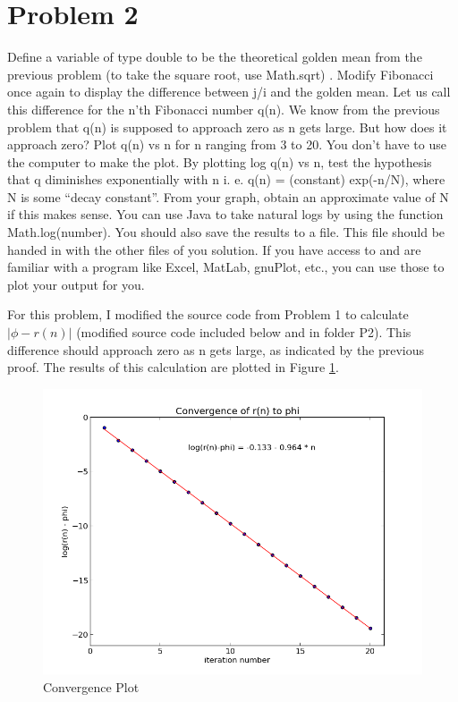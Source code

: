 \documentclass[aps,letterpaper,10pt]{article}
\begin{document}
\newpage
\section{Problem 2}
\begin{center}
\begin{minipage}[h]{.85\linewidth}
Define a variable of type double to be the theoretical golden mean from the previous problem (to take the square root, use Math.sqrt) . Modify Fibonacci once again to display the difference between j/i and the golden mean.  Let us call this difference for the n'th Fibonacci number q(n).  We know from the previous problem that q(n) is supposed to approach zero as n gets large.  But how does it approach zero?  Plot q(n) vs n for n ranging from 3 to 20.  You don't have to use the computer to make the plot.  By plotting log q(n) vs n, test the hypothesis that q diminishes exponentially with n i. e. q(n) = (constant) exp(-n/N), where N is some ``decay constant''.  From your graph, obtain an approximate value of N if this makes sense.  You can use Java to take natural logs by using the function Math.log(number). 
You should also save the results to a file. This file should be handed in with the other files of you solution. If you have access to and are familiar with a program like Excel, MatLab, gnuPlot, etc., you can use those to plot your output for you.
\end{minipage}
\end{center}

For this problem, I modified the source code from Problem 1 to calculate $|\phi - r(n)|$ (modified source code included below and in folder P2). This difference should approach zero as n gets large, as indicated by the previous proof. The results of this calculation are plotted in Figure \ref{fig: convergence}. 

\begin{figure}[!h]
\centering
\includegraphics[width=.8\textwidth]{P2/output.png}
\caption{Convergence Plot}
\label{fig: convergence}
\end{figure}
\end{document}
